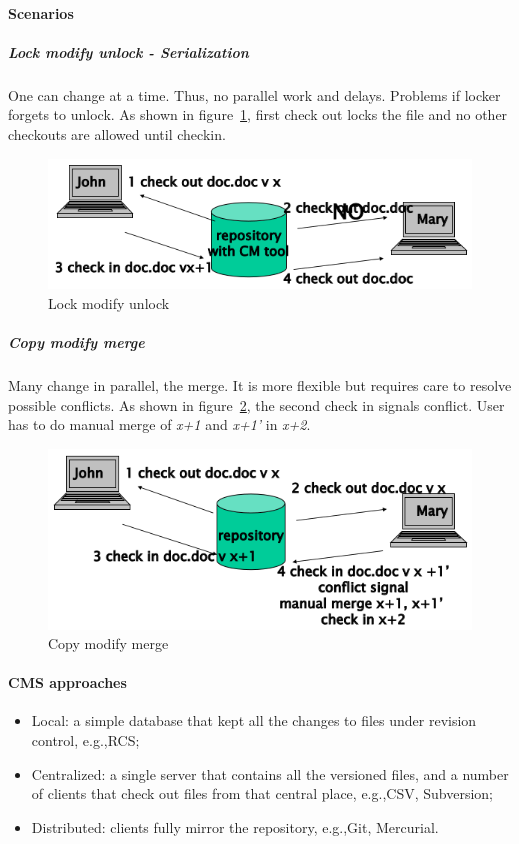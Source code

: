 \paragraph{Scenarios}
\subparagraph{Lock modify unlock - Serialization}
One can change at a time. Thus, no parallel work and delays. Problems if locker forgets to unlock. As shown in figure~\ref{img:lock_modify_unlock}, first check out locks the file and no other checkouts are allowed until checkin.

\begin{figure}[hbtp]
\centering
\includegraphics[scale=0.4]{images/lock_modify_unlock.png}
\caption{Lock modify unlock}
\label{img:lock_modify_unlock}
\end{figure}

\subparagraph{Copy modify merge}
Many change in parallel, the merge. It is more flexible but requires care to resolve possible conflicts. As shown in figure~\ref{img:copy_modify_merge}, the second check in signals conflict. User has to do manual merge of \emph{x+1} and \emph{x+1'} in \emph{x+2}.

\begin{figure}[hbtp]
\centering
\includegraphics[scale=0.4]{images/copy_modify_merge.png}
\caption{Copy modify merge}
\label{img:copy_modify_merge}
\end{figure}

\paragraph{CMS approaches}
\begin{itemize}
\item Local: a simple database that kept all the changes to files under revision control, e.g.,\@ RCS;
\item Centralized: a single server that contains all the versioned files, and a number of clients that check out files from that central place, e.g.,\@ CSV, Subversion;
\item Distributed: clients fully mirror the repository, e.g.,\@ Git, Mercurial.
\end{itemize}

